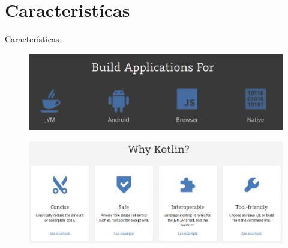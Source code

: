 \documentclass{beamer}
\begin{document}
\section{Caracteristícas}
\begin{frame}{Características}
	\begin{figure}[!htb]
		\centering
		\includegraphics[scale=.25]{caracteristicas.png}
	\end{figure}
	
	\begin{figure}[!htb]
		\centering
		\includegraphics[scale=.20]{why.png}
	\end{figure}
	
\end{frame}
\end{document}
